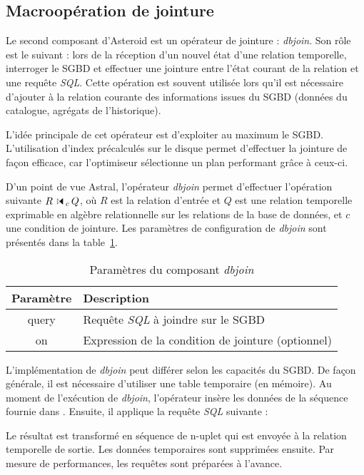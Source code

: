 \subsection{Macroopération de jointure}
Le second composant d'Asteroid est un opérateur de jointure : \textit{dbjoin}. Son rôle est le suivant : lors de la réception d'un nouvel état d'une relation temporelle, interroger le SGBD et effectuer une jointure entre l'état courant de la relation et une requête \textit{SQL}. Cette opération est souvent utilisée lors qu'il est nécessaire d'ajouter à la relation courante des informations issues du SGBD (données du catalogue, agrégats de l'historique).

L'idée principale de cet opérateur est d'exploiter au maximum le SGBD. L'utilisation d'index précalculés sur le disque permet d'effectuer la jointure de façon efficace, car l'optimiseur sélectionne un plan performant grâce à ceux-ci.

D'un point de vue Astral, l'opérateur \textit{dbjoin} permet d'effectuer l'opération suivante $R \ssjoin_c Q$, où $R$ est la relation d'entrée et $Q$ est une relation temporelle exprimable en algèbre relationnelle sur les relations de la base de données, et $c$ une condition de jointure. Les paramètres de configuration de \textit{dbjoin} sont présentés dans la table~\ref{tab:contrib:asteroid:dbjoin}.
\begin{table}[ht]
    \centering
    \begin{tabular}{cl}
        Paramètre & Description \\ \midrule
        query & Requête \textit{SQL} à joindre sur le SGBD \\
        on & Expression de la condition de jointure (optionnel)
    \end{tabular}
    \caption{Paramètres du composant \textit{dbjoin}}\label{tab:contrib:asteroid:dbjoin}
\end{table}

L'implémentation de \textit{dbjoin} peut différer selon les capacités du SGBD. De façon générale, il est nécessaire d'utiliser une table temporaire  (en mémoire). Au moment de l'exécution de \textit{dbjoin}, l'opérateur insère les données de la séquence fournie dans . Ensuite, il applique la requête \textit{SQL} suivante : \begin{center}  \end{center}
Le résultat est transformé en séquence de n-uplet qui est envoyée à la relation temporelle de sortie. Les données temporaires sont supprimées ensuite. Par mesure de performances, les requêtes sont préparées à l'avance.

